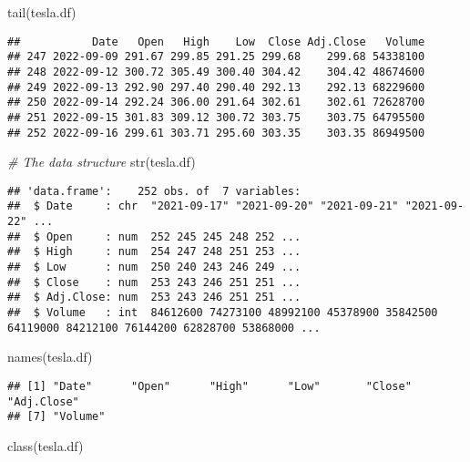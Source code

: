 \documentclass[
]{article}
\newenvironment{Shaded}{\begin{snugshade}}{\end{snugshade}}
\newcommand{\CommentTok}[1]{\textcolor[rgb]{0.56,0.35,0.01}{\textit{#1}}}
\newcommand{\FunctionTok}[1]{\textcolor[rgb]{0.00,0.00,0.00}{#1}}
\newcommand{\NormalTok}[1]{#1}
\begin{document}
\begin{Shaded}
\begin{Highlighting}[]
\FunctionTok{tail}\NormalTok{(tesla.df)}
\end{Highlighting}
\end{Shaded}

\begin{verbatim}
##           Date   Open   High    Low  Close Adj.Close   Volume
## 247 2022-09-09 291.67 299.85 291.25 299.68    299.68 54338100
## 248 2022-09-12 300.72 305.49 300.40 304.42    304.42 48674600
## 249 2022-09-13 292.90 297.40 290.40 292.13    292.13 68229600
## 250 2022-09-14 292.24 306.00 291.64 302.61    302.61 72628700
## 251 2022-09-15 301.83 309.12 300.72 303.75    303.75 64795500
## 252 2022-09-16 299.61 303.71 295.60 303.35    303.35 86949500
\end{verbatim}

\begin{Shaded}
\begin{Highlighting}[]
\CommentTok{\# The data structure}
\FunctionTok{str}\NormalTok{(tesla.df)}
\end{Highlighting}
\end{Shaded}

\begin{verbatim}
## 'data.frame':    252 obs. of  7 variables:
##  $ Date     : chr  "2021-09-17" "2021-09-20" "2021-09-21" "2021-09-22" ...
##  $ Open     : num  252 245 245 248 252 ...
##  $ High     : num  254 247 248 251 253 ...
##  $ Low      : num  250 240 243 246 249 ...
##  $ Close    : num  253 243 246 251 251 ...
##  $ Adj.Close: num  253 243 246 251 251 ...
##  $ Volume   : int  84612600 74273100 48992100 45378900 35842500 64119000 84212100 76144200 62828700 53868000 ...
\end{verbatim}

\begin{Shaded}
\begin{Highlighting}[]
\FunctionTok{names}\NormalTok{(tesla.df)}
\end{Highlighting}
\end{Shaded}

\begin{verbatim}
## [1] "Date"      "Open"      "High"      "Low"       "Close"     "Adj.Close"
## [7] "Volume"
\end{verbatim}

\begin{Shaded}
\begin{Highlighting}[]
\FunctionTok{class}\NormalTok{(tesla.df)}
\end{Highlighting}
\end{Shaded}
\end{document}
